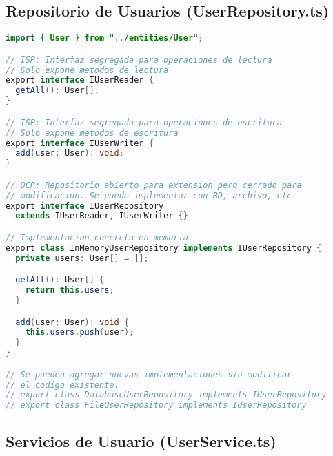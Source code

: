 \documentclass[11pt,a4paper]{article}
\begin{document}
\subsection*{Repositorio de Usuarios (UserRepository.ts)}

\begin{lstlisting}[language=Java]
import { User } from "../entities/User";

// ISP: Interfaz segregada para operaciones de lectura
// Solo expone metodos de lectura
export interface IUserReader {
  getAll(): User[];
}

// ISP: Interfaz segregada para operaciones de escritura
// Solo expone metodos de escritura
export interface IUserWriter {
  add(user: User): void;
}

// OCP: Repositorio abierto para extension pero cerrado para
// modificacion. Se puede implementar con BD, archivo, etc.
export interface IUserRepository
  extends IUserReader, IUserWriter {}

// Implementacion concreta en memoria
export class InMemoryUserRepository implements IUserRepository {
  private users: User[] = [];

  getAll(): User[] {
    return this.users;
  }

  add(user: User): void {
    this.users.push(user);
  }
}

// Se pueden agregar nuevas implementaciones sin modificar
// el codigo existente:
// export class DatabaseUserRepository implements IUserRepository
// export class FileUserRepository implements IUserRepository
\end{lstlisting}

\subsection*{Servicios de Usuario (UserService.ts)}
\end{document}
